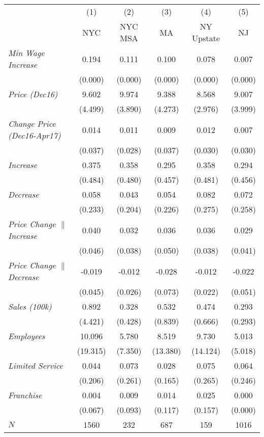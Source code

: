 \begin{center}
\begin{tabular}{lccccc}
\hline  & (1) & (2) & (3) & (4) & (5)\\
 & NYC & NYC MSA & MA & NY Upstate & NJ\\
\hline  \textit{Min Wage Increase}  & 0.194 & 0.111 & 0.100 & 0.078 & 0.007\\
  & (0.000) & (0.000) & (0.000) & (0.000) & (0.000)\\
 \textit{Price (Dec16)}  & 9.602 & 9.974 & 9.388 & 8.568 & 9.007\\
  & (4.499) & (3.890) & (4.273) & (2.976) & (3.999)\\
 \textit{Change Price (Dec16-Apr17)}  & 0.014 & 0.011 & 0.009 & 0.012 & 0.007\\
  & (0.037) & (0.028) & (0.037) & (0.030) & (0.030)\\
 \textit{Increase}  & 0.375 & 0.358 & 0.295 & 0.358 & 0.294\\
  & (0.484) & (0.480) & (0.457) & (0.481) & (0.456)\\
 \textit{Decrease}  & 0.058 & 0.043 & 0.054 & 0.082 & 0.072\\
  & (0.233) & (0.204) & (0.226) & (0.275) & (0.258)\\
 \textit{Price Change $\|$ Increase}  & 0.040 & 0.032 & 0.036 & 0.036 & 0.029\\
  & (0.046) & (0.038) & (0.050) & (0.038) & (0.041)\\
 \textit{Price Change $\|$ Decrease}  & -0.019 & -0.012 & -0.028 & -0.012 & -0.022\\
  & (0.045) & (0.026) & (0.073) & (0.022) & (0.051)\\
 \textit{Sales (100k)}  & 0.892 & 0.328 & 0.532 & 0.474 & 0.293\\
  & (4.421) & (0.428) & (0.839) & (0.666) & (0.293)\\
 \textit{Employees} & 10.096 & 5.780 & 8.519 & 9.730 & 5.013\\
  & (19.315) & (7.350) & (13.380) & (14.124) & (5.018)\\
 \textit{Limited Service}  & 0.044 & 0.073 & 0.028 & 0.075 & 0.064\\
  & (0.206) & (0.261) & (0.165) & (0.265) & (0.246)\\
 \textit{Franchise}  & 0.004 & 0.009 & 0.014 & 0.025 & 0.000\\
  & (0.067) & (0.093) & (0.117) & (0.157) & (0.000)\\
\hline  $ N $  & 1560 & 232 & 687 & 159 & 1016\\
\hline\end{tabular}\\
\end{center}
